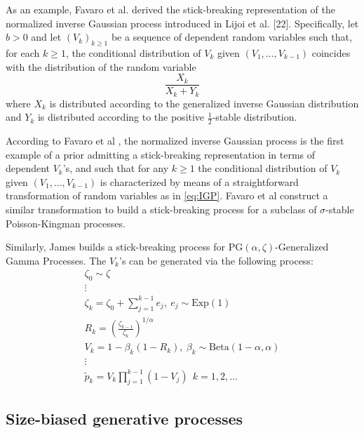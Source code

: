 As an example, Favaro et al. \cite{Favaro:2012ht} derived the stick-breaking representation of the normalized inverse Gaussian process introduced in Lijoi et al. [22]. Specifically, let $b > 0$ and let $(V_k)_{k \ge 1}$ be a sequence of dependent random variables such that, for each $k \ge 1$, the conditional distribution of $V_k$ given $(V_1,\dots,V_{k-1})$ coincides with the distribution of the random variable
\begin{equation} \label{eq:IGP}
\frac{X_k}{X_k + Y_k}
\end{equation}
where $X_k$ is distributed according to the generalized inverse Gaussian distribution and $Y_k$ is distributed according to the positive $\frac{1}{2}$-stable distribution.

According to Favaro et al \cite{Favaro:2014bo}, the normalized inverse Gaussian process \cite{Favaro:2012ht} is the first example of a prior admitting a stick-breaking representation in terms of dependent  $V_k$'s, and such that for any $k \ge 1$ the conditional distribution of $V_k$ given $(V_1,\dots,V_{k-1})$ is characterized by means of a straightforward transformation of random variables as in \ref{eq:IGP}.
Favaro et al \cite{Favaro:2014bo} construct a similar transformation to build a stick-breaking process for a subclass of $\sigma$-stable Poisson-Kingman processes.

Similarly, James \cite{James:2013uk} builds a stick-breaking process for $\text{PG}(\alpha,\zeta)$-Generalized Gamma Processes. The $V_k$'s can be generated via the following process:
\begin{gather*}
\zeta_0 \sim \zeta \\
\vdots \\
\zeta_k = \zeta_0 + \sum_{j=1}^{k-1}{e_j},\ e_j \sim \text{Exp}(1) \\
R_k = \left(\frac{\zeta_{k-1}}{\zeta_k}\right)^{1/\alpha} \\
V_k = 1 - \beta_k(1 - R_k), \ \beta_k \sim \text{Beta}(1-\alpha,\alpha) \\
\vdots \\
\tilde{p}_k = V_k \prod_{j=1}^{k-1}(1-V_j) \ \ k= 1,2,\dots
\end{gather*}

\subsection{Size-biased generative processes}

